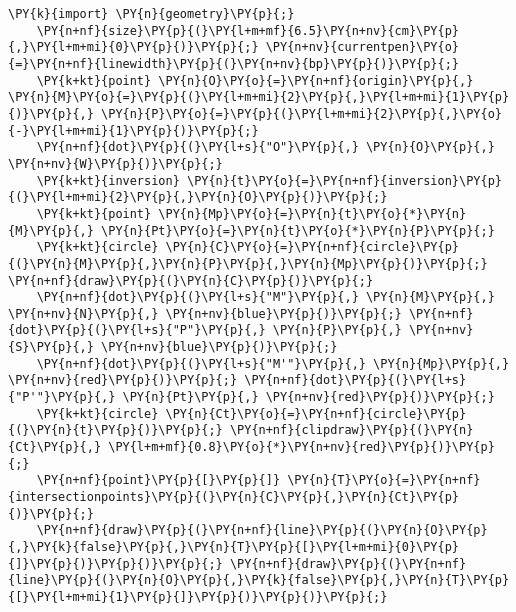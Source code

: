 \begin{Verbatim}[commandchars=\\\{\}]
    \PY{k}{import} \PY{n}{geometry}\PY{p}{;}
    \PY{n+nf}{size}\PY{p}{(}\PY{l+m+mf}{6.5}\PY{n+nv}{cm}\PY{p}{,}\PY{l+m+mi}{0}\PY{p}{)}\PY{p}{;} \PY{n+nv}{currentpen}\PY{o}{=}\PY{n+nf}{linewidth}\PY{p}{(}\PY{n+nv}{bp}\PY{p}{)}\PY{p}{;}
    \PY{k+kt}{point} \PY{n}{O}\PY{o}{=}\PY{n+nf}{origin}\PY{p}{,} \PY{n}{M}\PY{o}{=}\PY{p}{(}\PY{l+m+mi}{2}\PY{p}{,}\PY{l+m+mi}{1}\PY{p}{)}\PY{p}{,} \PY{n}{P}\PY{o}{=}\PY{p}{(}\PY{l+m+mi}{2}\PY{p}{,}\PY{o}{-}\PY{l+m+mi}{1}\PY{p}{)}\PY{p}{;}
    \PY{n+nf}{dot}\PY{p}{(}\PY{l+s}{"O"}\PY{p}{,} \PY{n}{O}\PY{p}{,} \PY{n+nv}{W}\PY{p}{)}\PY{p}{;}
    \PY{k+kt}{inversion} \PY{n}{t}\PY{o}{=}\PY{n+nf}{inversion}\PY{p}{(}\PY{l+m+mi}{2}\PY{p}{,}\PY{n}{O}\PY{p}{)}\PY{p}{;}
    \PY{k+kt}{point} \PY{n}{Mp}\PY{o}{=}\PY{n}{t}\PY{o}{*}\PY{n}{M}\PY{p}{,} \PY{n}{Pt}\PY{o}{=}\PY{n}{t}\PY{o}{*}\PY{n}{P}\PY{p}{;}
    \PY{k+kt}{circle} \PY{n}{C}\PY{o}{=}\PY{n+nf}{circle}\PY{p}{(}\PY{n}{M}\PY{p}{,}\PY{n}{P}\PY{p}{,}\PY{n}{Mp}\PY{p}{)}\PY{p}{;} \PY{n+nf}{draw}\PY{p}{(}\PY{n}{C}\PY{p}{)}\PY{p}{;}
    \PY{n+nf}{dot}\PY{p}{(}\PY{l+s}{"M"}\PY{p}{,} \PY{n}{M}\PY{p}{,} \PY{n+nv}{N}\PY{p}{,} \PY{n+nv}{blue}\PY{p}{)}\PY{p}{;} \PY{n+nf}{dot}\PY{p}{(}\PY{l+s}{"P"}\PY{p}{,} \PY{n}{P}\PY{p}{,} \PY{n+nv}{S}\PY{p}{,} \PY{n+nv}{blue}\PY{p}{)}\PY{p}{;}
    \PY{n+nf}{dot}\PY{p}{(}\PY{l+s}{"M'"}\PY{p}{,} \PY{n}{Mp}\PY{p}{,} \PY{n+nv}{red}\PY{p}{)}\PY{p}{;} \PY{n+nf}{dot}\PY{p}{(}\PY{l+s}{"P'"}\PY{p}{,} \PY{n}{Pt}\PY{p}{,} \PY{n+nv}{red}\PY{p}{)}\PY{p}{;}
    \PY{k+kt}{circle} \PY{n}{Ct}\PY{o}{=}\PY{n+nf}{circle}\PY{p}{(}\PY{n}{t}\PY{p}{)}\PY{p}{;} \PY{n+nf}{clipdraw}\PY{p}{(}\PY{n}{Ct}\PY{p}{,} \PY{l+m+mf}{0.8}\PY{o}{*}\PY{n+nv}{red}\PY{p}{)}\PY{p}{;}
    \PY{n+nf}{point}\PY{p}{[}\PY{p}{]} \PY{n}{T}\PY{o}{=}\PY{n+nf}{intersectionpoints}\PY{p}{(}\PY{n}{C}\PY{p}{,}\PY{n}{Ct}\PY{p}{)}\PY{p}{;}
    \PY{n+nf}{draw}\PY{p}{(}\PY{n+nf}{line}\PY{p}{(}\PY{n}{O}\PY{p}{,}\PY{k}{false}\PY{p}{,}\PY{n}{T}\PY{p}{[}\PY{l+m+mi}{0}\PY{p}{]}\PY{p}{)}\PY{p}{)}\PY{p}{;} \PY{n+nf}{draw}\PY{p}{(}\PY{n+nf}{line}\PY{p}{(}\PY{n}{O}\PY{p}{,}\PY{k}{false}\PY{p}{,}\PY{n}{T}\PY{p}{[}\PY{l+m+mi}{1}\PY{p}{]}\PY{p}{)}\PY{p}{)}\PY{p}{;}
\end{Verbatim}

